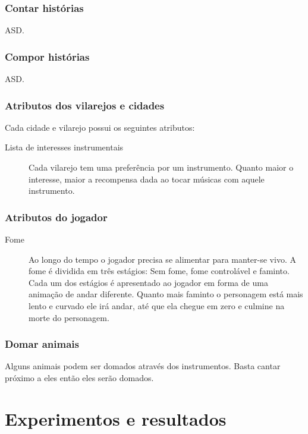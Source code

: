 \documentclass[12pt, 
openright, 
oneside, 
a4paper,    
brazil]{facom-ufu-abntex2}
\begin{document}
\subsection{Contar histórias}
ASD.
\subsection{Compor histórias}
ASD.
\subsection{Atributos dos vilarejos e cidades}
Cada cidade e vilarejo possui os seguintes atributos:
\begin{description}  
\item [Lista de interesses instrumentais] Cada vilarejo tem uma preferência por um instrumento. Quanto maior o interesse, maior a recompensa dada ao tocar músicas com aquele instrumento.
\end{description}

\subsection{Atributos do jogador}
\begin{description}  
\item [Fome] Ao longo do tempo o jogador precisa se alimentar para manter-se vivo. A fome é dividida em três estágios: Sem fome, fome controlável e faminto. Cada um dos estágios é
apresentado ao jogador em forma de uma animação de andar diferente. Quanto mais faminto o personagem está mais lento e curvado ele irá andar, até que ela chegue em zero e culmine na morte do personagem.
\end{description}

\subsection{Domar animais}
Alguns animais podem ser domados através dos instrumentos. Basta cantar próximo a eles então eles serão domados.

\chapter{Experimentos e resultados}
\label{sec:experim}
\end{document}
